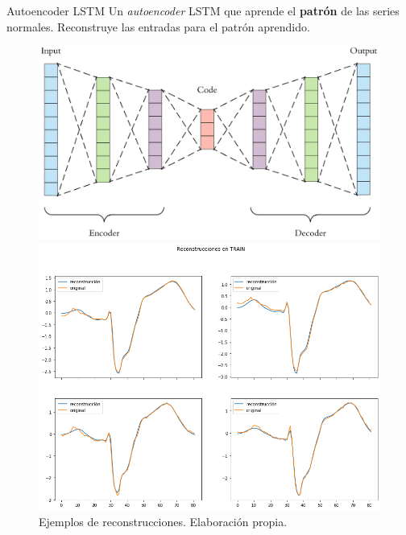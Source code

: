 \documentclass[spanish]{beamer}
\begin{document}
\begin{frame}{Autoencoder LSTM}
  Un \emph{autoencoder} LSTM que aprende el \textbf{patrón} de las series normales. Reconstruye las entradas para el patrón aprendido.

  \begin{figure}[ht]
    \centering
    \begin{minipage}[b]{.45\textwidth}
      \centering
      \includegraphics[width=1\linewidth]{img/ae}
      \caption{Arquitectura autoencoder. Extraído de \href{http://www.cs.us.es/~fsancho/?e=232}{[enlace]}.}
    \end{minipage}
    \hspace{0.5cm}
    \begin{minipage}[b]{.45\textwidth}
      \centering
      \includegraphics[width=1\linewidth]{img/ae-reconstruccion}
      \caption{Ejemplos de reconstrucciones. Elaboración propia.}
    \end{minipage}
  \end{figure}
\end{frame}
\end{document}

